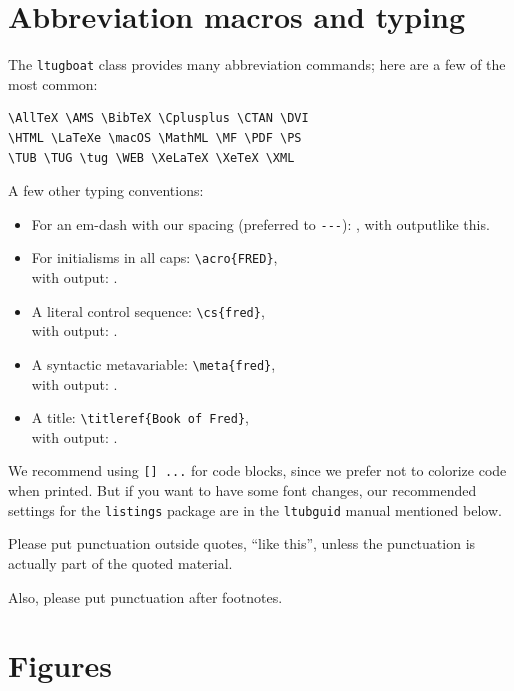 \documentclass{ltugboat}
\begin{document}
\section{Abbreviation macros and typing}

The \texttt{ltugboat} class provides many abbreviation commands; here
are a few of the most common:

\begin{verbatim}
\AllTeX \AMS \BibTeX \Cplusplus \CTAN \DVI
\HTML \LaTeXe \macOS \MathML \MF \PDF \PS
\TUB \TUG \tug \WEB \XeLaTeX \XeTeX \XML
\end{verbatim}

A few other typing conventions:

\begin{itemize}
\item For an em-dash with our spacing (preferred to \verb|---|):
, with output\Dash like this.

\item For initialisms in all caps:
\verb|\acro{FRED}|,\\ with output: .

\item A literal control sequence:
\verb|\cs{fred}|,\\ with output: .

\item A syntactic metavariable:
\verb|\meta{fred}|,\\ with output: .

\item A title:
\verb|\titleref{Book of Fred}|,\\ with output: .
\end{itemize}

We recommend using \texttt{[\small] ...}
 for code blocks, since we prefer not to
colorize code when printed. But if you want to have some font changes,
our recommended settings for the \texttt{listings} package are in the
\texttt{ltubguid} manual mentioned below.

Please put punctuation outside quotes, ``like this'', unless the
punctuation is actually part of the quoted material.

Also, please put punctuation after footnotes.

\section{Figures}
\end{document}
